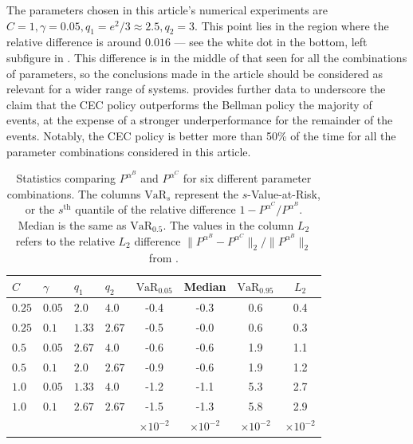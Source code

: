 \documentclass[main.tex]{subfiles}
\begin{document}
The parameters chosen in this article's numerical experiments
are $C=1,\gamma=0.05,q_1=e^2/3\approx2.5,q_2=3$. This point lies
in the region where the relative difference is around $0.016$ --- see the
white dot in the
bottom, left subfigure in .
This difference is in the middle of that seen for all the
combinations of parameters, so the conclusions made in the article
should be considered as relevant for a wider range of systems.
 provides further data to underscore
the claim that the CEC policy
outperforms the Bellman policy the
majority of events, at the expense of a stronger underperformance
for the remainder of the events. Notably, the CEC policy is better
more than 50\% of the time for all the parameter
combinations considered in this article.

\begin{table}[htbp]
  \centering
  \begin{tabular}{llllcccc}
    $C$ & $\gamma$ & $q_1$ & $q_2$ & $\mbox{VaR}_{0.05}$
    &Median & $\mbox{VaR}_{0.95}$ &$L_2$\\
    \toprule
    $0.25$ & $0.05$ & $2.0$ & $4.0$ & -0.4 & -0.3 & 0.6 & 0.4 \\
    $0.25$ & $0.1$ & $1.33$ & $2.67$ & -0.5 & -0.0 & 0.6 & 0.3 \\
    $0.5$ & $0.05$ & $2.67$ & $4.0$ & -0.6 & -0.6 & 1.9 & 1.1 \\
    $0.5$ & $0.1$ & $2.0$ & $2.67$ & -0.9 & -0.6 & 1.9 & 1.2 \\
    $1.0$ & $0.05$ & $1.33$ & $4.0$ & -1.2 & -1.1 & 5.3 & 2.7 \\
    $1.0$ & $0.1$ & $2.67$ & $2.67$ & -1.5 & -1.3 & 5.8 & 2.9\\
    &&&&$\times 10^{-2}$&$\times 10^{-2}$&$\times 10^{-2}$&$\times 10^{-2}$\\
    \bottomrule
  \end{tabular}
  \caption{Statistics comparing $P^{\alpha^B}$ and $P^{\alpha^C}$ for six different
    parameter combinations. The columns $\mbox{VaR}_s$ represent the
    $s$-Value-at-Risk, or the $s^{\text{th}}$ quantile of the relative
    difference
    $1-P^{\alpha^C}/P^{\alpha^B}$. Median is the same as $\mbox{VaR}_{0.5}$.
    The values in the column $L_2$ refers to the relative $L_2$
    difference $\|P^{\alpha^B}-P^{\alpha^C}\|_2/\|P^{\alpha^B}\|_2$
    from .
  }\label{tbl:paramcomparisons}
\end{table}
\biblio
\end{document}
